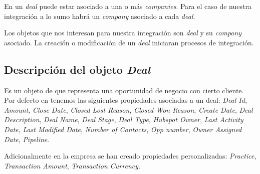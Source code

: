 En \hs{} un \textit{deal} puede estar asociado a una o más \textit{companies}. Para el caso de nuestra integración a lo sumo habrá un \textit{company} asociado a cada \textit{deal}.

Los objetos que nos interesan para nuestra integración son \textit{deal} y su \textit{company} asociado. La creación o modificación de un \textit{deal} iniciaran procesos de integración.



\subsection{Descripción del objeto \textit{Deal}}
	Es un objeto de \hs{} que representa una oportunidad de negocio con cierto cliente. Por defecto en \hs{} tenemos las siguientes propiedades asociadas a un deal:			
		\textit{Deal Id}, \textit{Amount}, \textit{Close Date}, \textit{Closed Lost Reason}, \textit{Closed Won Reason}, \textit{Create Date}, \textit{Deal Description}, \textit{Deal Name}, \textit{Deal Stage}, \textit{Deal Type}, \textit{Hubspot Owner}, \textit{Last Activity Date}, \textit{Last Modified Date}, \textit{Number of Contacts},
		\textit{Opp number}, \textit{Owner Assigned Date}, \textit{Pipeline}.
		
		Adicionalmente en la empresa se han creado propiedades personalizadas: \textit{Practice}, \textit{Transaction Amount}, \textit{Transaction Currency}.\\
		
